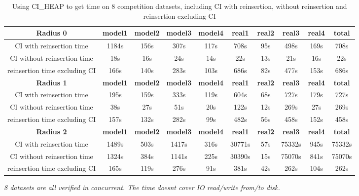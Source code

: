 \documentclass{article}
\begin{document}
	\begin{table}[!htbp]
	\begin{adjustwidth}{-2cm}{}		
		\begin{threeparttable}		
			\centering
			\caption{Using CI\_HEAP to get time on 8 competition datasets, including CI with reinsertion, without reinsertion and reinsertion excluding CI}
			\label{tab:table11}
			\begin{tabular}{|c|c|c|c|c|c|c|c|c|c|}
				\hline
				\textbf{Radius 0} & \textbf{model1} & \textbf{model2} & \textbf{model3} & \textbf{model4} & \textbf{real1} & \textbf{real2} & \textbf{real3} & \textbf{real4} & \textbf{total} \\ \hline
				
				CI with reinsertion time                 & 1184s&156s&307s&117s&708s&95s&498s&169s&708s         \\ \hline
				CI without reinsertion time                             & 18s&16s&24s&14s&22s&13s&21s&16s&22s            \\ \hline
				reinsertion time excluding CI                         & 166s&140s&283s&103s&686s&82s&477s&153s&686s               \\ \hline
				
				\textbf{Radius 1} & \textbf{model1} & \textbf{model2} & \textbf{model3} & \textbf{model4} & \textbf{real1} & \textbf{real2} & \textbf{real3} & \textbf{real4} & \textbf{total} \\ \hline
				
				CI with reinsertion time                 & 195s&159s&333s&119s&604s&68s&727s&179s&727s         \\ \hline
				CI without reinsertion time                             & 38s&27s&51s&20s&122s&12s&269s&27s&269s            \\ \hline
				reinsertion time excluding CI                         & 157s&132s&282s&99s&482s&56s&458s&152s&458s               \\ \hline					
				
				\textbf{Radius 2} & \textbf{model1} & \textbf{model2} & \textbf{model3} & \textbf{model4} & \textbf{real1} & \textbf{real2} & \textbf{real3} & \textbf{real4} & \textbf{total} \\ \hline
				CI with reinsertion time                 & 1489s&503s&1417s&316s&30771s&57s&75332s&945s&75332s         \\ \hline
				CI without reinsertion time                             & 1324s&384s&1141s&225s&30390s&15s&75070s&841s&75070s         \\ \hline
				reinsertion time excluding CI                         & 165s&119s&276s&91s&381s&42s&262s&104s&262s                \\ \hline				
			\end{tabular}
			\begin{tablenotes}
				\small
				\item\textit{ 8 datasets are all verified in concurrent. The time doesn\textquotesingle t cover IO read/write from/to disk.}
			\end{tablenotes}			
		\end{threeparttable}
	\end{adjustwidth}	
	\end{table}	
\end{document}

